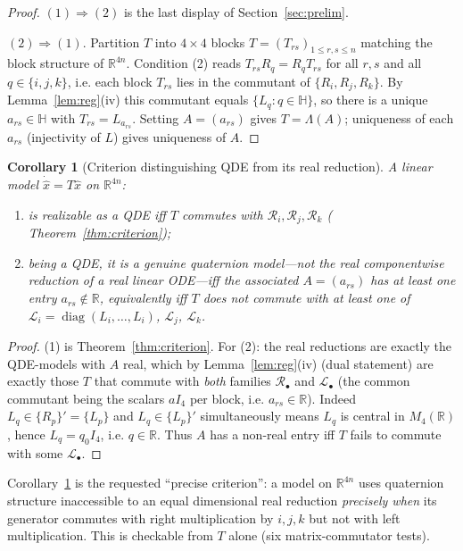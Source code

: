 \documentclass{amsart}
\newtheorem{corollary}[theorem]{Corollary}
\theoremstyle{definition}
\newcommand{\HH}{\mathbb{H}}
\newcommand{\RR}{\mathbb{R}}
\newcommand{\diag}{\operatorname{diag}}
\begin{document}
\begin{proof}
$(1)\Rightarrow(2)$ is the last display of Section~\ref{sec:prelim}.

$(2)\Rightarrow(1)$. Partition $T$ into $4\times4$ blocks
$T=(T_{rs})_{1\le r,s\le n}$ matching the block structure of $\RR^{4n}$.
Condition (2) reads $T_{rs}R_q=R_qT_{rs}$ for all $r,s$ and all
$q\in\{i,j,k\}$, i.e. each block $T_{rs}$ lies in the commutant of
$\{R_i,R_j,R_k\}$. By Lemma~\ref{lem:reg}(iv) this commutant equals
$\{L_q:q\in\HH\}$, so there is a unique $a_{rs}\in\HH$ with
$T_{rs}=L_{a_{rs}}$. Setting $A=(a_{rs})$ gives $T=\Lambda(A)$;
uniqueness of each $a_{rs}$ (injectivity of $L$) gives uniqueness of
$A$.
\end{proof}

\begin{corollary}[Criterion distinguishing QDE from its real reduction]
\label{cor:distinguish}
A linear model $\dot{\widehat x}=T\widehat x$ on $\RR^{4n}$:
\begin{enumerate}
\item is \emph{realizable as a QDE} iff $T$ commutes with
$\mathcal R_i,\mathcal R_j,\mathcal R_k$ \textup{(}
Theorem~\ref{thm:criterion}\textup{)};
\item being a QDE, it is a \emph{genuine} quaternion model—not the real
componentwise reduction of a real linear ODE—iff the associated
$A=(a_{rs})$ has at least one entry $a_{rs}\notin\RR$, equivalently iff
$T$ does \emph{not} commute with at least one of
$\mathcal L_i=\diag(L_i,\dots,L_i)$, $\mathcal L_j$, $\mathcal L_k$.
\end{enumerate}
\end{corollary}

\begin{proof}
(1) is Theorem~\ref{thm:criterion}. For (2): the real reductions are
exactly the QDE-models with $A$ real, which by
Lemma~\ref{lem:reg}(iv) (dual statement) are exactly those $T$ that
commute with \emph{both} families $\mathcal R_\bullet$ and
$\mathcal L_\bullet$ (the common commutant being the scalars $aI_4$ per
block, i.e. $a_{rs}\in\RR$). Indeed $L_q\in\{R_p\}'=\{L_p\}$ and
$L_q\in\{L_p\}'$ simultaneously means $L_q$ is central in $M_4(\RR)$,
hence $L_q=q_0 I_4$, i.e. $q\in\RR$. Thus $A$ has a non-real entry iff
$T$ fails to commute with some $\mathcal L_\bullet$.
\end{proof}

Corollary~\ref{cor:distinguish} is the requested ``precise criterion'':
a model on $\RR^{4n}$ uses quaternion structure inaccessible to an equal
dimensional real reduction \emph{precisely when} its generator commutes
with right multiplication by $i,j,k$ but not with left multiplication.
This is checkable from $T$ alone (six matrix-commutator tests).
\end{document}
